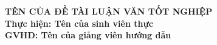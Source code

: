 \begin{titlepage}
    \begin{center}
        \Large{\bfseries TÊN CỦA ĐỀ TÀI LUẬN VĂN TỐT NGHIỆP} \\ [1cm]

    \Large{\bfseries Thực hiện: Tên của sinh viên thực} \\ [1cm]

    \Large{\bfseries GVHD: Tên của giảng viên hướng dẫn}
    \end{center}
\end{titlepage}
